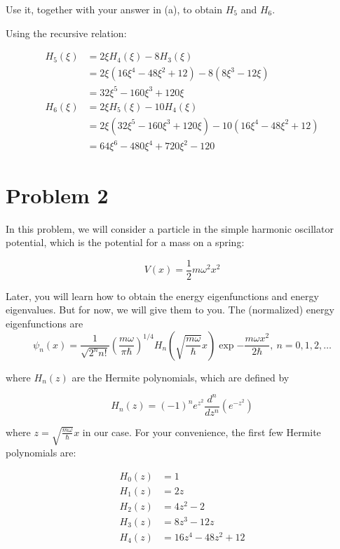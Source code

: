 \documentclass[10pt]{article}
\begin{document}
\begin{enumerate}[(a)]
    Use it, together with your answer in (a), to obtain $H_5$ and $H_6$. 


    \begin{solution}
        Using the recursive relation:

        \begin{align*}
            H_5(\xi) &= 2\xi H_4(\xi) - 8 H_3(\xi)\\
            &= 2\xi(16 \xi^4 - 48\xi^2 + 12) - 8(8\xi^3 - 12\xi)\\
            &= 32 \xi^5 - 160 \xi^3 + 120\xi\\
            H_6(\xi) &= 2\xi H_5(\xi) - 10H_4(\xi)\\
            &= 2\xi (32 \xi^5 - 160 \xi^3 + 120\xi) - 10 (16\xi^4 - 48 \xi^2 + 12)\\
            &= 64 \xi^6 - 480 \xi^4 + 720 \xi^2 - 120
        \end{align*}
    \end{solution}
    \end{enumerate}

    \pagebreak

    \section*{Problem 2}

    In this problem, we will consider a particle in the simple harmonic oscillator potential, which is the potential for a mass on a spring:

    \[ V(x) = \frac{1}{2} m\omega^2x^2\]

    Later, you will learn how to obtain the energy eigenfunctions and energy eigenvalues. But for now, we will give them to you. The (normalized) energy eigenfunctions are
    \[ \psi_n(x) = \frac{1}{\sqrt{2^n n!}}\left(\frac{m\omega}{\pi \hbar}\right)^{1/4} H_n\left(\sqrt{\frac{m\omega}{\hbar}} x\right) \exp{-\frac{m\omega x^2}{2\hbar}},\  n = 0, 1, 2, \dots\]

    where $H_n(z)$ are the Hermite polynomials, which are defined by 

    \[ H_n(z) = (-1)^n e^{z^2} \frac{d^n}{dz^n}(e^{-z^2})\] 

    where $z = \sqrt{\frac{m\omega}{\hbar}} x$ in our case. For your convenience, the first few Hermite polynomials are:

    \begin{align*}
        H_0(z) &= 1\\
        H_1(z) &= 2z\\
        H_2(z) &= 4z^2 - 2\\
        H_3(z) &= 8z^3 - 12z\\
        H_4(z) &= 16z^4 - 48z^2 + 12
    \end{align*}
\end{document}
